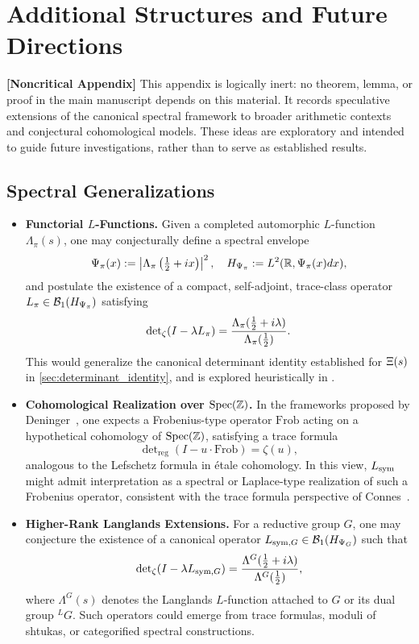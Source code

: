 \section{Additional Structures and Future Directions}
\label{app:additional_structures}

\noindent\textbf{[Noncritical Appendix]}  
This appendix is logically inert: no theorem, lemma, or proof in the main manuscript depends on this material. It records speculative extensions of the canonical spectral framework to broader arithmetic contexts and conjectural cohomological models. These ideas are exploratory and intended to guide future investigations, rather than to serve as established results.

\subsection*{Spectral Generalizations}

\begin{itemize}
  \item \textbf{Functorial \( L \)-Functions.}  
  Given a completed automorphic \( L \)-function \( \Lambda_\pi(s) \), one may conjecturally define a spectral envelope
  \[
  \Psi_\pi(x) := \left| \Lambda_\pi\left( \tfrac{1}{2} + i x \right) \right|^2, \quad
  H_{\Psi_\pi} := L^2(\mathbb{R}, \Psi_\pi(x) dx),
  \]
  and postulate the existence of a compact, self-adjoint, trace-class operator \( L_\pi \in \mathcal{B}_1(H_{\Psi_\pi}) \) satisfying
  \[
  \det\nolimits_{\zeta}(I - \lambda L_\pi) = \frac{\Lambda_\pi(\tfrac{1}{2} + i\lambda)}{\Lambda_\pi(\tfrac{1}{2})}.
  \]
  This would generalize the canonical determinant identity established for \( \Xi(s) \) in \cref{sec:determinant_identity}, and is explored heuristically in .

  \item \textbf{Cohomological Realization over \( \operatorname{Spec}(\mathbb{Z}) \).}  
  In the frameworks proposed by Deninger~\cite{Deninger1998Frobenius}, one expects a Frobenius-type operator \( \mathrm{Frob} \) acting on a hypothetical cohomology of \( \operatorname{Spec}(\mathbb{Z}) \), satisfying a trace formula
  \[
  \det\nolimits_{\mathrm{reg}}(I - u \cdot \mathrm{Frob}) = \zeta(u),
  \]
  analogous to the Lefschetz formula in étale cohomology. In this view, \( L_{\mathrm{sym}} \) might admit interpretation as a spectral or Laplace-type realization of such a Frobenius operator, consistent with the trace formula perspective of Connes~\cite{Connes1999TraceFormula}.

  \item \textbf{Higher-Rank Langlands Extensions.}  
  For a reductive group \( G \), one may conjecture the existence of a canonical operator \( L_{\mathrm{sym},G} \in \mathcal{B}_1(H_{\Psi_G}) \) such that
  \[
  \det\nolimits_{\zeta}(I - \lambda L_{\mathrm{sym},G}) = \frac{\Lambda^G(\tfrac{1}{2} + i\lambda)}{\Lambda^G(\tfrac{1}{2})},
  \]
  where \( \Lambda^G(s) \) denotes the Langlands \( L \)-function attached to \( G \) or its dual group \( {}^LG \). Such operators could emerge from trace formulas, moduli of shtukas, or categorified spectral constructions.
\end{itemize}

